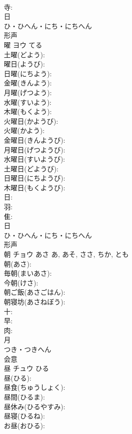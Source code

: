 \documentclass[8pt]{extreport}
\begin{document}
\begin{CJK}{UTF8}{min}
\\	寺: 
\\	日	
\\	ひ・ひへん・にち・にちへん	
\\	形声 
\\	曜	ヨウ		てる	
\\	土曜(どよう): 
\\	曜日(ようび): 
\\	日曜(にちよう): 
\\	金曜(きんよう): 
\\	月曜(げつよう): 
\\	水曜(すいよう): 
\\	木曜(もくよう): 
\\	火曜日(かようび): 
\\	火曜(かよう): 
\\	金曜日(きんようび): 
\\	月曜日(げつようび): 
\\	水曜日(すいようび): 
\\	土曜日(どようび): 
\\	日曜日(にちようび): 
\\	木曜日(もくようび): 
\\	日: 
\\	羽: 
\\	隹: 
\\	日	
\\	ひ・ひへん・にち・にちへん	
\\	形声 
\\	朝	チョウ	あさ	あ, あそ, ささ, ちか, とも	
\\	朝(あさ): 
\\	毎朝(まいあさ): 
\\	今朝(けさ): 
\\	朝ご飯(あさごはん): 
\\	朝寝坊(あさねぼう): 
\\	十: 
\\	早: 
\\	肉: 
\\	月	
\\	つき・つきへん	
\\	会意 
\\	昼	チュウ	ひる		
\\	昼(ひる): 
\\	昼食(ちゅうしょく): 
\\	昼間(ひるま): 
\\	昼休み(ひるやすみ): 
\\	昼寝(ひるね): 
\\	お昼(おひる): 

\end{CJK}
\end{document}
